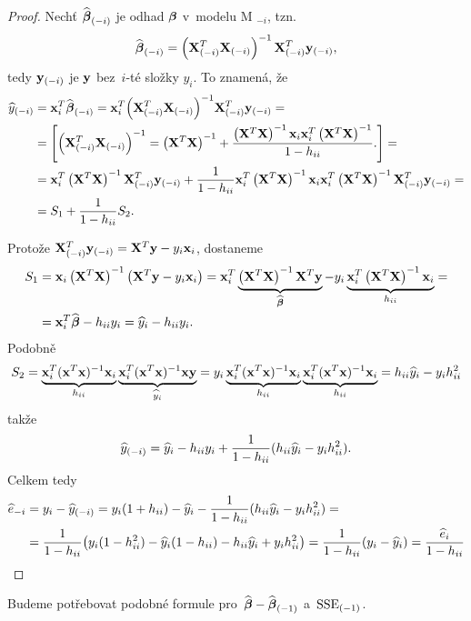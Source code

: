 \begin{proof}
	
	Nechť $\wbetab_{(-i)}$ je odhad $\betab$ v~modelu M $_{-i}$, tzn.
	 $$
	\wbetab_{(-i)} = \left(\X_{(-i)}^T \X_{(-i)} \right)^{-1} \X_{(-i)}^T \y_{(-i)},
	 $$
	tedy $\y_{(-i)}$ je $\y$ bez~$i$-té složky $y_i$. To znamená, že
	\begin{align*}
	\hy_{(-i)} & = \x_i^T \wbetab_{(-i)} = \x_i^T \inv{\left(\X_{(-i)}^T \X_{(-i)} \right)} \X_{(-i)}^T \y_{(-i)} = \\
	 & = \left[\left(\X_{(-i)}^T \X_{(-i)} \right)^{-1} = \XtX + \frac{\XtX \x_i \x_i^T \XtX}{1 - \hii}. \right] = \\
	 & = \x_i^T \XtX \X_{(-i)}^T \y_{(-i)} + \frac{1}{1 - \hii} \x_i^T \XtX \x_i \x_i^T \XtX \X_{(-i)}^T \y_{(-i)} = \\
	 & = S_1 + \frac{1}{1-\hii} S_2.
	\end{align*}
	
	Protože $\X_{(-i)}^T \y_{(-i)} = \X^T \y - y_i \x_i$, dostaneme
	\begin{align*}
	S_1 & = \x_i \XtX \left(\X^T \y - y_i \x_i \right) = \x_i^T \underbrace{\XtX \X^T \y}_{\wbetab} - y_i \underbrace{\x_i^T \XtX \x_i}_{\hii} = \\
	& = \x_i^T \wbetab - \hii y_i = \hy_i - \hii y_i.
	\end{align*}
	Podobně	
	 $$ S_2 = \underbrace{\x_i^T(\x^T\x)^{-1}\x_i}_{h_{ii}}\underbrace{\x_i^T(\x^T\x)^{-1}\x\y}_{\hyi} = y_i\underbrace{\x_i^T(\x^T\x)^{-1}\x_i}_{h_{ii}}\underbrace{\x_i^T(\x^T\x)^{-1}\x_i}_{h_{ii}} = h_{ii}\hyi-y_ih_{ii}^2 $$
	takže
	 $$ \hy_{(-i)} = \hyi-h_{ii}y_i+\frac{1}{1-h_{ii}}(h_{ii}\hyi-y_ih_{ii}^2). $$
	Celkem tedy
	\begin{align*}
	\he_{-i} & = y_i-\hy_{(-i)} = y_i(1+h_{ii})-\hyi-\frac{1}{1-h_{ii}}(h_{ii}\hyi-y_ih_{ii}^2) = \\
	& = \frac{1}{1-h_{ii}}\big(y_i(1-h_{ii}^2)-\hyi(1-h_{ii})-h_{ii}\hyi+y_ih_{ii}^2\big) = \frac{1}{1-h_{ii}}(y_i-\hyi) = \frac{\hei}{1-h_{ii}}
	\end{align*}
\end{proof}Budeme potřebovat podobné formule pro~$\wbetab-\wbetab_{(-1)}$ a~$\mini{\SSE}$.

